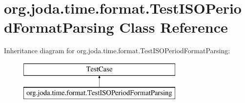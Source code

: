 \hypertarget{classorg_1_1joda_1_1time_1_1format_1_1_test_i_s_o_period_format_parsing}{\section{org.\-joda.\-time.\-format.\-Test\-I\-S\-O\-Period\-Format\-Parsing Class Reference}
\label{classorg_1_1joda_1_1time_1_1format_1_1_test_i_s_o_period_format_parsing}
}
Inheritance diagram for org.\-joda.\-time.\-format.\-Test\-I\-S\-O\-Period\-Format\-Parsing\-:\begin{figure}[H]
\begin{center}
\leavevmode
\includegraphics[height=2.000000cm]{classorg_1_1joda_1_1time_1_1format_1_1_test_i_s_o_period_format_parsing}
\end{center}
\end{figure}
